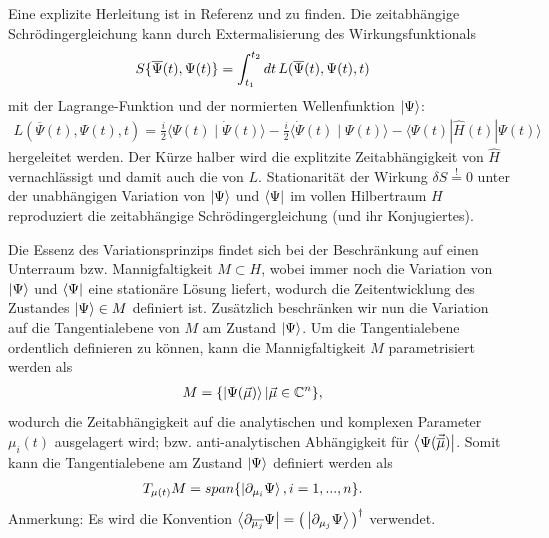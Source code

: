 Eine explizite Herleitung ist in Referenz \cite{noauthor_2008-dn} und \cite{Haegeman_2011} zu finden.
Die zeitabhängige Schrödingergleichung kann durch Extermalisierung des Wirkungsfunktionals
\begin{align}\label{Wirkungsfunktional}
    S\{\overline{\Psi}(t),\Psi(t)\} &=  \int_{t_1}^{t_2}dt \thinspace L(\overline{\Psi}(t),\Psi(t),t)
\end{align}
mit der Lagrange-Funktion und der normierten Wellenfunktion $\ket{\Psi}$:
\begin{align}\label{Lagrange}
    L\left(\overline{\Psi}(t), \Psi(t), t\right)=\frac{i}{2}\langle\Psi(t) \mid \dot{\Psi}(t)\rangle-\frac{i}{2}\langle\dot{\Psi}(t) \mid \Psi(t)\rangle-\langle\Psi(t)|\hat{H}(t)| \Psi(t)\rangle
\end{align}
hergeleitet werden. Der Kürze halber wird die explitzite Zeitabhängigkeit von $\hat{H}$ vernachlässigt und damit auch die von $L$. Stationarität der Wirkung 
$\delta S \overset{!}{=} 0$ unter der unabhängigen Variation von $\ket{\Psi}$ und $\bra{\Psi}$ im vollen Hilbertraum $H$ reproduziert die zeitabhängige 
Schrödingergleichung (und ihr Konjugiertes).\

Die Essenz des Variationsprinzips findet sich bei der Beschränkung auf einen Unterraum bzw. Mannigfaltigkeit $M\subset H$, wobei 
immer noch die Variation von $\ket{\Psi}$ und $\bra{\Psi}$ eine stationäre Lösung liefert, wodurch die Zeitentwicklung des Zustandes $\ket{\Psi} \in M$
definiert ist. Zusätzlich beschränken wir nun die Variation auf die Tangentialebene von $M$ am Zustand $\ket{\Psi}$. Um die Tangentialebene ordentlich 
definieren zu können, kann die Mannigfaltigkeit $M$ parametrisiert werden als   
\begin{align}
    M &= \{\ket{\Psi(\vec{\mu})}|\vec{\mu}\in \mathbb{C}^n\},
\end{align}
wodurch die Zeitabhängigkeit auf die analytischen und komplexen Parameter $\mu_i(t)$ ausgelagert wird; bzw. anti-analytischen Abhängigkeit für 
$\bra{\Psi(\vec{\overline{\mu}})}$. Somit kann die Tangentialebene am Zustand $\ket{\Psi}$ definiert werden als  
\begin{align}
    T_{\mu(t)}M &= span\{\ket{\partial_{\mu_i}\Psi}, i = 1,...,n\}.
\end{align}
Anmerkung: Es wird die Konvention $\bra{\partial_{\overline{\mu_j}}\Psi} = \left(\thinspace\ket{\partial_{\mu_j}\Psi}\thinspace\right)^\dagger$ verwendet.

